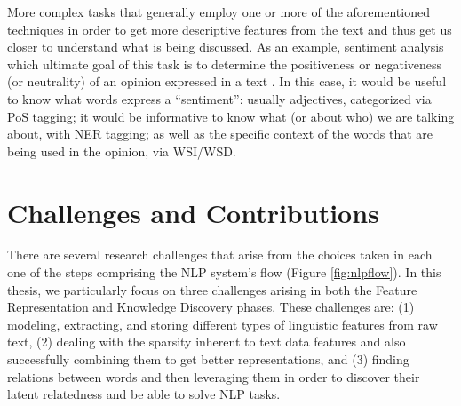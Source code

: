 More complex tasks that generally employ one or more of the aforementioned techniques in order to get more descriptive features from the text and thus get us closer to understand what is being discussed. As an example,  sentiment analysis  which ultimate goal of this task is to determine the positiveness or negativeness (or neutrality) of an opinion expressed in a text \cite{liu2012survey}. In this case, it would be useful to know what words express a ``sentiment'': usually adjectives, categorized via PoS tagging; it would be informative to know what (or about who) we are talking about, with NER tagging; as well as the specific context of the words that are being used in the opinion, via WSI/WSD. 



\section{Challenges and Contributions}
There are several research challenges that arise from the choices taken in each one of the steps comprising the NLP system's flow (Figure \ref{fig:nlpflow}).
 In this thesis, we particularly focus on three challenges arising in both the Feature Representation and Knowledge Discovery phases. These challenges are: (1) modeling, extracting, and storing different types of linguistic features from raw text, (2) dealing with the sparsity inherent to text data features and also successfully combining them to get better representations, and (3)  finding	 relations  between words and then leveraging them in order to discover their latent relatedness and be able to solve NLP tasks.

%	


